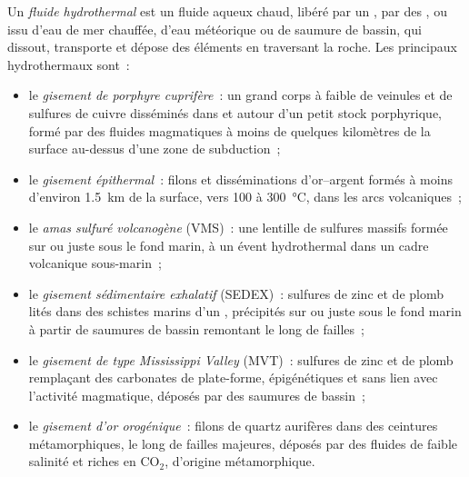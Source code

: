 \begin{definition}\label{def:b2:ore-deposits:hydrothermal}
Un \emph{fluide hydrothermal} est un fluide aqueux chaud, libéré par un
, par des , ou issu d'eau de mer chauffée, d'eau météorique ou de
saumure de bassin, qui dissout, transporte et dépose des éléments en traversant la roche. Les
principaux  hydrothermaux sont~:
\begin{itemize}
  \item le \emph{gisement de porphyre cuprifère}~: un grand corps à faible  de veinules
        et de sulfures de cuivre disséminés dans et autour d'un petit stock porphyrique, formé par des fluides magmatiques
        à moins de quelques kilomètres de la surface au-dessus d'une zone de subduction~;
  \item le \emph{gisement épithermal}~: filons et disséminations d'or--argent
        formés à moins d'environ \qty{1.5}{km} de la surface, vers 100 à
        \qty{300}{\celsius}, dans les arcs volcaniques~;
  \item le \emph{amas sulfuré volcanogène}
        (VMS)~: une lentille de sulfures massifs formée sur ou juste sous le fond marin, à un évent
        hydrothermal dans un cadre volcanique sous-marin~;
  \item le \emph{gisement sédimentaire exhalatif} (SEDEX)~:
        sulfures de zinc et de plomb lités dans des schistes marins d'un , précipités sur ou
        juste sous le fond marin à partir de saumures de bassin remontant le long de failles~;
  \item le \emph{gisement de type Mississippi Valley} (MVT)~:
        sulfures de zinc et de plomb remplaçant des carbonates de plate-forme, épigénétiques et sans lien
        avec l'activité magmatique, déposés par des saumures de bassin~;
  \item le \emph{gisement d'or orogénique}~: filons de quartz aurifères dans
        des ceintures métamorphiques, le long de failles majeures, déposés par des fluides de faible
        salinité et riches en CO$_2$, d'origine métamorphique.
\end{itemize}
\end{definition}

